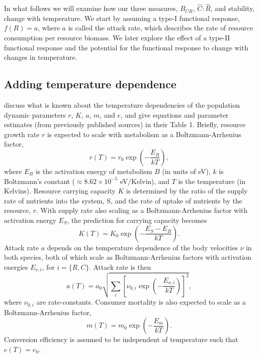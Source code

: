 \documentclass[11pt]{article}
\begin{document}
In what follows we will examine how our three measures, $B_{CR}$, $\hat{C}:\hat{R}$, and stability, change with temperature.
We start by assuming a type-I functional response, $f(R) = a$, where $a$ is called the attack rate, which describes the rate of resource consumption per resource biomass.
We later explore the effect of a type-II functional response and the potential for the functional response to change with changes in temperature.

\subsection*{Adding temperature dependence}

\cite{Gilbert2014} discuss what is known about the temperature dependencies of the population dynamic parameters $r$, $K$, $a$, $m$, and $e$, and give equations and parameter estimates (from previously published sources) in their Table 1.
Briefly, resource growth rate $r$ is expected to scale with metabolism as a Boltzmann-Arrhenius factor, 
\[r(T) = r_0 \exp \left(-\frac{E_B}{kT} \right),\] 
where $E_B$ is the activation energy of metabolism $B$ (in units of eV), $k$ is Boltzmann's constant ($\approx 8.62 \times 10^{-5}$ eV/Kelvin), and $T$ is the temperature (in Kelvins).
Resource carrying capacity $K$ is determined by the ratio of the supply rate of nutrients into the system, S, and the rate of uptake of nutrients by the resource, $r$.
With supply rate also scaling as a Boltzmann-Arrhenius factor with activation energy $E_S$, the prediction for carrying capacity becomes
\[K(T) = K_0 \exp \left(-\frac{E_S - E_B}{kT} \right).\] 
Attack rate $a$ depends on the temperature dependence of the body velocities $\nu$ in both species, both of which scale as Boltzmann-Arrhenius factors with activation energies $E_{\nu,i}$, for $i=\{R,C\}$.
Attack rate is then 
\[a(T) = a_0 \sqrt{\sum_i \left[\nu_{0,i} \exp \left(-\frac{E_{\nu,i}}{kT} \right) \right]^2},\] 
where $\nu_{0,i}$ are rate-constants.
Consumer mortality is also expected to scale as a Boltzmann-Arrhenius factor, 
\[m(T) = m_0 \exp \left( -\frac{E_m}{kT} \right).\]
Conversion efficiency is assumed to be independent of temperature such that $e(T) = e_0$.
\end{document}
